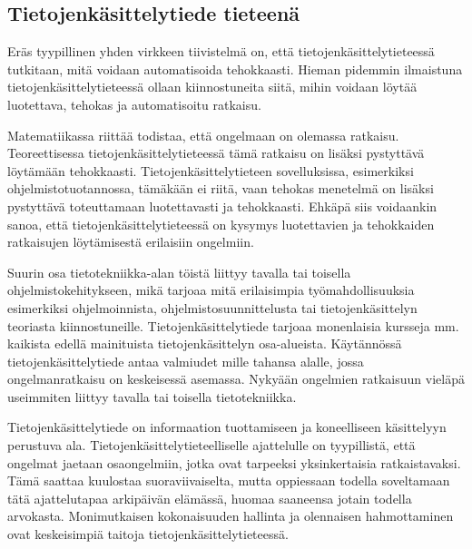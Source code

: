 \documentclass[../ala_hataile.tex]{subfiles}
\begin{document}
	\clearpage
	
	\raggedbottom
	
	\subsection*{Tietojen\-käsittely\-tiede tieteenä}
	Eräs tyypillinen yhden
	virkkeen tiivistelmä on, että tietojen\-käsittely\-tieteessä
	tutkitaan, mitä voidaan automatisoida
	tehokkaasti. Hieman pidemmin
	ilmaistuna tietojen\-käsittely\-tieteessä ollaan
	kiinnostuneita siitä, mihin voidaan löytää
	luotettava, tehokas ja automatisoitu ratkaisu.
	
	Matematiikassa riittää todistaa, että
	ongelmaan on olemassa ratkaisu. Teoreettisessa
	tietojen\-käsittely\-tieteessä tämä
	ratkaisu on lisäksi pystyttävä löytämään
	tehokkaasti. Tietojen\-käsittely\-tieteen sovelluksissa,
	esimerkiksi ohjelmistotuotannossa,
	tämäkään ei riitä, vaan tehokas menetelmä
	on lisäksi pystyttävä toteuttamaan
	luotettavasti ja tehokkaasti. Ehkäpä siis
	voidaankin sanoa, että tietojen\-käsittely\-tieteessä
	on kysymys luotettavien ja tehokkaiden
	ratkaisujen löytämisestä erilaisiin
	ongelmiin.
	
	Suurin osa tietotekniikka-alan töistä
	liittyy tavalla tai toisella ohjelmistokehitykseen,
	mikä tarjoaa mitä erilaisimpia
	työmahdollisuuksia esimerkiksi ohjelmoinnista,
	ohjelmistosuunnittelusta tai
	tietojenkäsittelyn teoriasta kiinnostuneille.
	Tietojen\-käsittely\-tiede tarjoaa
	monenlaisia kursseja mm.\,kaikista edellä
	mainituista tietojenkäsittelyn osa-alueista.
	Käytännössä tietojen\-käsittely\-tiede antaa
	valmiudet mille tahansa alalle, jossa ongelmanratkaisu
	on keskeisessä asemassa. Nykyään ongelmien ratkaisuun vieläpä
	useimmiten liittyy tavalla tai toisella tietotekniikka.
	
	Tietojen\-käsittely\-tiede on informaation
	tuottamiseen ja koneelliseen käsittelyyn
	perustuva ala. Tietojen\-käsittely\-tieteelliselle
	ajattelulle on tyypillistä, että ongelmat
	jaetaan osaongelmiin, jotka ovat tarpeeksi
	yksinkertaisia ratkaistavaksi. Tämä saattaa
	kuulostaa suoraviivaiselta, mutta oppiessaan
	todella soveltamaan tätä ajattelutapaa
	arkipäivän elämässä, huomaa saaneensa
	jotain todella arvokasta. Monimutkaisen
	kokonaisuuden hallinta ja olennaisen hahmottaminen
	ovat keskeisimpiä taitoja tietojen\-käsittely\-tieteessä.
	
\end{document}
